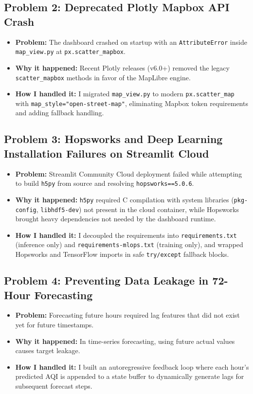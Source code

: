 \documentclass[12pt,a4paper]{article}
\begin{document}
\subsection{Problem 2: Deprecated Plotly Mapbox API Crash}
\begin{itemize}
    \item \textbf{Problem:} The dashboard crashed on startup with an \texttt{AttributeError} inside \texttt{map\_view.py} at \texttt{px.scatter\_mapbox}.
    \item \textbf{Why it happened:} Recent Plotly releases (v6.0+) removed the legacy \texttt{scatter\_mapbox} methods in favor of the MapLibre engine.
    \item \textbf{How I handled it:} I migrated \texttt{map\_view.py} to modern \texttt{px.scatter\_map} with \texttt{map\_style="open-street-map"}, eliminating Mapbox token requirements and adding fallback handling.
\end{itemize}

\subsection{Problem 3: Hopsworks and Deep Learning Installation Failures on Streamlit Cloud}
\begin{itemize}
    \item \textbf{Problem:} Streamlit Community Cloud deployment failed while attempting to build \texttt{h5py} from source and resolving \texttt{hopsworks==5.0.6}.
    \item \textbf{Why it happened:} \texttt{h5py} required C compilation with system libraries (\texttt{pkg-config}, \texttt{libhdf5-dev}) not present in the cloud container, while Hopsworks brought heavy dependencies not needed by the dashboard runtime.
    \item \textbf{How I handled it:} I decoupled the requirements into \texttt{requirements.txt} (inference only) and \texttt{requirements-mlops.txt} (training only), and wrapped Hopsworks and TensorFlow imports in safe \texttt{try/except} fallback blocks.
\end{itemize}

\subsection{Problem 4: Preventing Data Leakage in 72-Hour Forecasting}
\begin{itemize}
    \item \textbf{Problem:} Forecasting future hours required lag features that did not exist yet for future timestamps.
    \item \textbf{Why it happened:} In time-series forecasting, using future actual values causes target leakage.
    \item \textbf{How I handled it:} I built an autoregressive feedback loop where each hour's predicted AQI is appended to a state buffer to dynamically generate lags for subsequent forecast steps.
\end{itemize}
\end{document}
